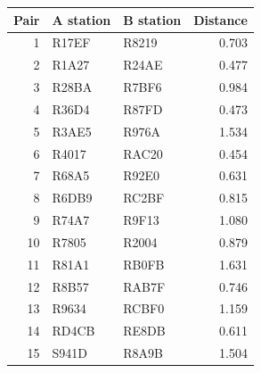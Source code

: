 \begin{tabular}{rllr}
\toprule
Pair & A station & B station & Distance \\
\midrule
1 & R17EF & R8219 & 0.703 \\
2 & R1A27 & R24AE & 0.477 \\
3 & R28BA & R7BF6 & 0.984 \\
4 & R36D4 & R87FD & 0.473 \\
5 & R3AE5 & R976A & 1.534 \\
6 & R4017 & RAC20 & 0.454 \\
7 & R68A5 & R92E0 & 0.631 \\
8 & R6DB9 & RC2BF & 0.815 \\
9 & R74A7 & R9F13 & 1.080 \\
10 & R7805 & R2004 & 0.879 \\
11 & R81A1 & RB0FB & 1.631 \\
12 & R8B57 & RAB7F & 0.746 \\
13 & R9634 & RCBF0 & 1.159 \\
14 & RD4CB & RE8DB & 0.611 \\
15 & S941D & R8A9B & 1.504 \\
\bottomrule
\end{tabular}
